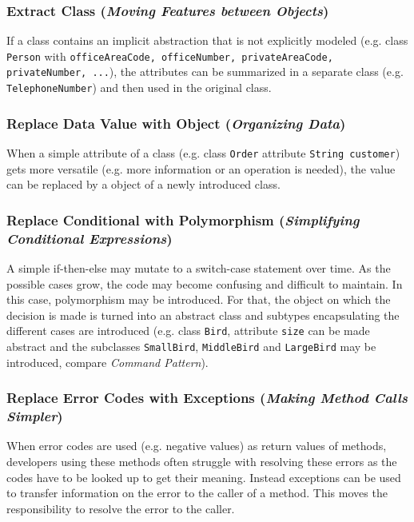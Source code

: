 \subsubsection*{Extract Class (\textit{Moving Features between Objects})}
If a class contains an implicit abstraction that is not explicitly modeled (e.g. class \texttt{Person} with \texttt{officeAreaCode, officeNumber, privateAreaCode, privateNumber, ...}), the attributes can be summarized in a separate class (e.g. \texttt{TelephoneNumber}) and then used in the original class.

\subsubsection*{Replace Data Value with Object (\textit{Organizing Data})}
When a simple attribute of a class (e.g. class \texttt{Order} attribute \texttt{String customer}) gets more versatile (e.g. more information or an operation is needed), the value can be replaced by a object of a newly introduced class.

\subsubsection*{Replace Conditional with Polymorphism (\textit{Simplifying Conditional Expressions})}
A simple if-then-else may mutate to a switch-case statement over time.
As the possible cases grow, the code may become confusing and difficult to maintain.
In this case, polymorphism may be introduced.
For that, the object on which the decision is made is turned into an abstract class and subtypes encapsulating the different cases are introduced
(e.g. class \texttt{Bird}, attribute \texttt{size} can be made abstract and the subclasses \texttt{SmallBird}, \texttt{MiddleBird} and \texttt{LargeBird} may be introduced, compare \textit{Command Pattern}).

\subsubsection*{Replace Error Codes with Exceptions (\textit{Making Method Calls Simpler})}
When error codes are used (e.g. negative values) as return values of methods, developers using these methods often struggle with resolving these errors as the codes have to be looked up to get their meaning.
Instead exceptions can be used to transfer information on the error to the caller of a method.
This moves the responsibility to resolve the error to the caller.

\newpage
